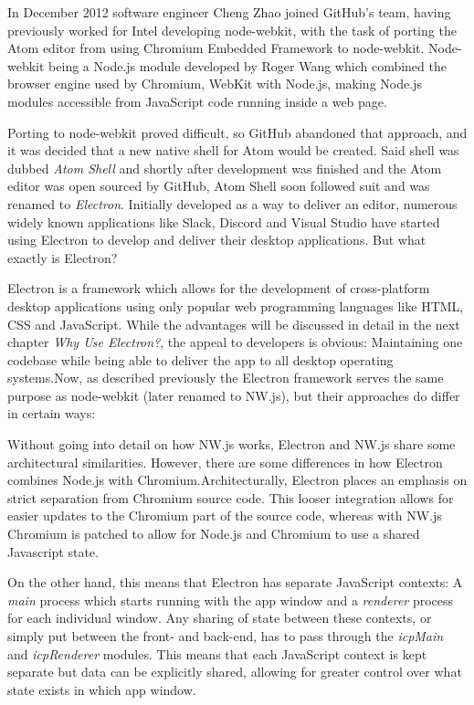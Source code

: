 In December 2012 software engineer Cheng Zhao joined GitHub's team, having previously worked for Intel developing
node-webkit, with the task of porting the Atom editor from using Chromium Embedded Framework to node-webkit.
Node-webkit being a Node.js module developed by Roger Wang which combined the browser engine used by Chromium, WebKit 
with Node.js, making Node.js modules accessible from JavaScript code running inside a web page.\cite{jensen2017}\linebreak[1]

Porting to node-webkit proved difficult, so GitHub abandoned that approach, and it was decided that a new native shell
for Atom would be created.
Said shell was dubbed \emph{Atom Shell} and shortly after development was finished and the Atom editor was open sourced
by GitHub, Atom Shell soon followed suit and was renamed to \emph{Electron}.
Initially developed as a way to deliver an editor, numerous widely known applications like Slack, Discord and Visual
Studio have started using Electron to develop and deliver their desktop applications.
But what exactly is Electron?\par
Electron is a framework which allows for the development of cross-platform desktop applications using only popular 
web programming languages like HTML, CSS and JavaScript. 
While the advantages will be discussed in detail in the next chapter \emph{Why Use Electron?}, the appeal to developers
is obvious: Maintaining one codebase while being able to deliver the app to all desktop operating systems.\linebreak[1]
Now, as described previously the Electron framework serves the same purpose as node-webkit (later renamed to NW.js), but
their approaches do differ in certain ways:\cite{jensen2017}\par
Without going into detail on how NW.js works, Electron and NW.js share some architectural similarities.
However, there are some differences in how Electron combines Node.js with Chromium.\linebreak[1]
Architecturally, Electron places an emphasis on strict separation from Chromium source code.
This looser integration allows for easier updates to the Chromium part of the source code, whereas with NW.js Chromium
is patched to allow for Node.js and Chromium to use a shared Javascript state.\cite{jensen2017}\par
On the other hand, this means that Electron has separate JavaScript contexts: A \emph{main} process which starts running
with the app window and a \emph{renderer} process for each individual window.
Any sharing of state between these contexts, or simply put between the front- and back-end, has to pass through the
\emph{icpMain} and \emph{icpRenderer} modules.
This means that each JavaScript context is kept separate but data can be explicitly shared, allowing for greater control
over what state exists in which app window.\cite{jensen2017}\par
